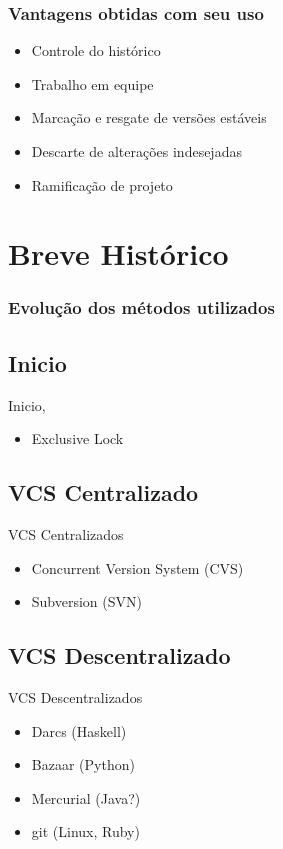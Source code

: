 \documentclass{beamer}
\begin{document}
  \begin{frame}
    \frametitle{Vantagens obtidas com seu uso}
    \begin{itemize}
      \item Controle do histórico
      \item Trabalho em equipe
      \item Marcação e resgate de versões estáveis
      \item Descarte de alterações indesejadas
      \item Ramificação de projeto
    \end{itemize}
    \vfill
  \end{frame}

  \section{Breve Histórico}
  \begin{frame}
    \frametitle{Evolução dos métodos utilizados}
    \subsection{Inicio}
    Inicio, 
    \begin{itemize}
      \item Exclusive Lock
    \end{itemize}

    \subsection{VCS Centralizado}
    VCS Centralizados
    \begin{itemize}
      \item Concurrent Version System (CVS)
      \item Subversion (SVN)
    \end{itemize}
    \subsection{VCS Descentralizado}
    VCS Descentralizados
    \begin{itemize}
      \item Darcs (Haskell)
      \item Bazaar (Python)
      \item Mercurial (Java?)
      \item git (Linux, Ruby)
    \end{itemize}
    \vfill
  \end{frame}
\end{document}
